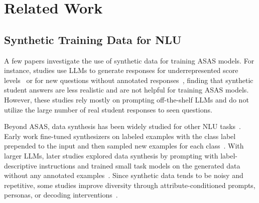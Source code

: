 \section{Related Work}

\subsection{Synthetic Training Data for NLU}

A few papers investigate the use of synthetic data for training ASAS models. For instance, studies use LLMs to generate responses for underrepresented score levels~\citep{fangUsingGPT4Augment2024} or for new questions without annotated responses~\citep{bexteLunchFreeOvercoming2025}, finding that synthetic student answers are less realistic and are not helpful for training ASAS models. However, these studies rely mostly on prompting off-the-shelf LLMs and do not utilize the large number of real student responses to seen questions.

Beyond ASAS, data synthesis has been widely studied for other NLU tasks~\citep{fengSurveyDataAugmentation2021,longLLMsDrivenSyntheticData2024}.
Early work fine-tuned synthesizers on labeled examples with the class label prepended to the input and then sampled new examples for each class~\citep{anabytavorNotHaveEnough2020,kumarDataAugmentationUsing2020}.
With larger LLMs, later studies explored data synthesis by prompting with label-descriptive instructions and trained small task models on the generated data without any annotated examples~\citep{schickGeneratingDatasetsPretrained2021,yeZeroGenEfficientZeroshot2022,mengGeneratingTrainingData2022}.
Since synthetic data tends to be noisy and repetitive, some studies improve diversity through attribute-conditioned prompts, personas, or decoding interventions~\citep{yuLargeLanguageModel2023,chungIncreasingDiversityMaintaining2023,geScalingSyntheticData2025}.

